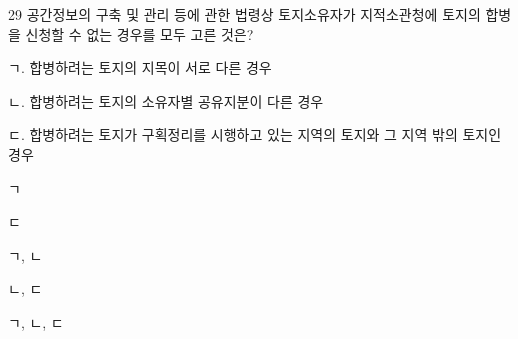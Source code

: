 \begin{question}{29}
공간정보의 구축 및 관리 등에 관한 법령상 토지소유자가 지적소관청에 토지의 합병을 신청할 수 없는 경우를 모두 고른 것은?
\begin{framedtext}
ㄱ. 합병하려는 토지의 지목이 서로 다른 경우 \par
ㄴ. 합병하려는 토지의 소유자별 공유지분이 다른 경우 \par
ㄷ. 합병하려는 토지가 구획정리를 시행하고 있는 지역의 토지와 그 지역 밖의 토지인 경우 \par
\end{framedtext}
\begin{choices}
  \item ㄱ
  \item ㄷ
  \item ㄱ, ㄴ
  \item ㄴ, ㄷ
  \item ㄱ, ㄴ, ㄷ
\end{choices}
\end{question}
